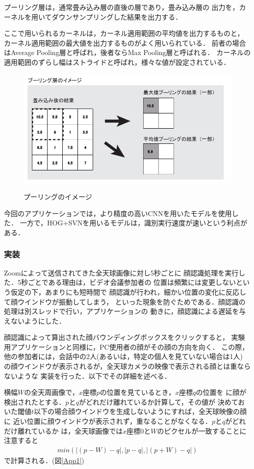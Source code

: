 プーリング層は，通常畳み込み層の直後の層であり，畳み込み層の
出力を，カーネルを用いてダウンサンプリングした結果を出力する．

ここで用いられるカーネルは，カーネル適用範囲の平均値を出力するものと，
カーネル適用範囲の最大値を出力するものがよく用いられている．
前者の場合はAverage Pooling層と呼ばれ，後者ならMax Pooling層と呼ばれる．
カーネルの適用範囲のずらし幅はストライドと呼ばれ，様々な値が設定されている．

\begin{figure}[tp]
  \centering
  \includegraphics[scale=0.7]{fig/pooling.png}
  \caption{プーリングのイメージ} \cite{14}
\end{figure}

今回のアプリケーションでは，より精度の高いCNNを用いたモデルを使用した．
一方で，HOG+SVNを用いるモデルは，識別実行速度が速いという利点がある．

\subsubsection*{実装}
Zoomによって送信されてきた全天球画像に対し5秒ごとに
顔認識処理を実行した．5秒ごとである理由は，ビデオ会議参加者の
位置は頻繁には変更しないという仮定の下，あまりにも短時間で
顔認識が行われ，細かい位置の変化に反応して顔ウインドウが振動してしまう，
といった現象を防ぐためである．顔認識の処理は別スレッドで行い，アプリケーションの
動きに，顔認識による遅延を与えないようにした．

顔認識によって算出された顔バウンディングボックスをクリックすると，
実験用アプリケーションと同様に，PC使用者の顔がその顔の方向を向く．
この際，他の参加者には，会話中の2人(あるいは，特定の個人を見ていない場合は1人)
の顔ウインドウが表示されるが，全天球カメラの映像で表示される顔とは重ならないような
実装を行った．以下でその詳細を述べる．

横幅$W$の全天周画像で，$x$座標$p$の位置を見ているとき，$x$座標$q$の位置を
に顔が検出されたとする．$p$と$q$がどれだけ離れているか計算して，その値が
決めておいた閾値$t$以下の場合顔ウインドウを生成しないようにすれば，全天球映像の顔に
近い位置に顔ウインドウが表示されず，重なることがなくなる．$p$と$q$がどれだけ離れているか
は，全天球画像では$x$座標$0$と$W$のピクセルが一致することに注意すると
\begin{eqnarray}
  min(|(p-W)-q|,|p-q|,|(p+W)-q|) \nonumber 
\end{eqnarray}
で計算される．(図\ref{App1})

